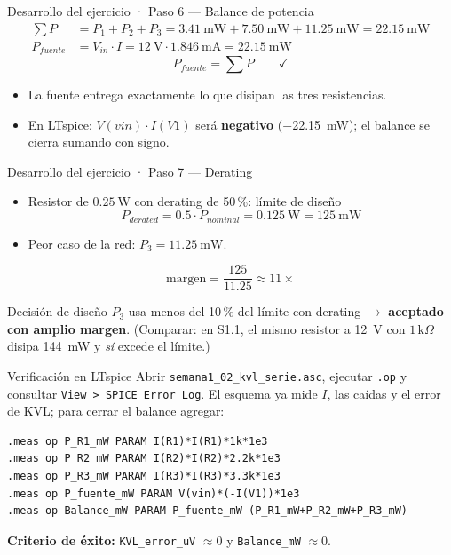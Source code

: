 \documentclass[aspectratio=169]{beamer}
\begin{document}
\begin{frame}{Desarrollo del ejercicio · Paso 6 — Balance de potencia}
  \begin{align*}
    \sum P &= P_1 + P_2 + P_3
             = \SI{3.41}{\milli\watt} + \SI{7.50}{\milli\watt} + \SI{11.25}{\milli\watt}
             = \SI{22.15}{\milli\watt}\\[4pt]
    P_{fuente} &= V_{in}\cdot I = \SI{12}{\volt}\cdot \SI{1.846}{\milli\ampere}
                 = \SI{22.15}{\milli\watt}
  \end{align*}
  \[
    \boxed{\;P_{fuente} = \sum P \qquad\checkmark\;}
  \]
  \pause
  \begin{itemize}
    \item La fuente entrega exactamente lo que disipan las tres resistencias.
    \item En LTspice: $V(vin)\cdot I(V1)$ será \textbf{negativo} (\SI{-22.15}{\milli\watt}); el balance se cierra sumando con signo.
  \end{itemize}
\end{frame}

\begin{frame}{Desarrollo del ejercicio · Paso 7 — Derating}
  \begin{itemize}
    \item Resistor de $\SI{0.25}{\watt}$ con derating de 50\,\%: límite de diseño
      \[
        P_{derated} = 0.5\cdot P_{nominal} = \SI{0.125}{\watt} = \SI{125}{\milli\watt}
      \]
    \item Peor caso de la red: $P_3 = \SI{11.25}{\milli\watt}$.
  \end{itemize}
  \[
    \text{margen} = \frac{125}{11.25} \approx 11\times
  \]
  \begin{block}{Decisión de diseño}
    $P_3$ usa menos del 10\,\% del límite con derating $\rightarrow$ \textbf{aceptado
    con amplio margen}. (Comparar: en S1.1, el mismo resistor a \SI{12}{\volt} con
    $1\,\text{k}\Omega$ disipa \SI{144}{\milli\watt} y \emph{sí} excede el límite.)
  \end{block}
\end{frame}

\begin{frame}[fragile]{Verificación en LTspice}
  Abrir \texttt{semana1\_02\_kvl\_serie.asc}, ejecutar \texttt{.op} y consultar
  \texttt{View > SPICE Error Log}. El esquema ya mide $I$, las caídas y el error
  de KVL; para cerrar el balance agregar:

  \begin{verbatim}
.meas op P_R1_mW PARAM I(R1)*I(R1)*1k*1e3
.meas op P_R2_mW PARAM I(R2)*I(R2)*2.2k*1e3
.meas op P_R3_mW PARAM I(R3)*I(R3)*3.3k*1e3
.meas op P_fuente_mW PARAM V(vin)*(-I(V1))*1e3
.meas op Balance_mW PARAM P_fuente_mW-(P_R1_mW+P_R2_mW+P_R3_mW)
  \end{verbatim}

  \textbf{Criterio de éxito:} \texttt{KVL\_error\_uV} $\approx 0$ y
  \texttt{Balance\_mW} $\approx 0$.
\end{frame}
\end{document}
